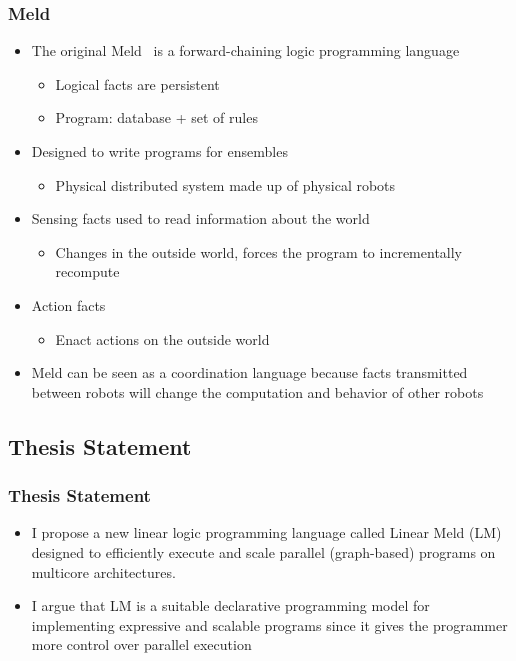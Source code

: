 \documentclass{beamer}
\begin{document}
\frame
{
   \frametitle{Meld}
   \begin{itemize}
      \item The original Meld~\cite{ashley-rollman-iclp09} is a forward-chaining logic programming language
      \begin{itemize}
         \item Logical facts are persistent
         \item Program: database + set of rules
      \end{itemize}
      
      \item Designed to write programs for ensembles
      \begin{itemize}
         \item Physical distributed system made up of physical robots
      \end{itemize}
      
      \item Sensing facts used to read information about the world
      \begin{itemize}
         \item Changes in the outside world, forces the program to incrementally recompute
      \end{itemize}
      
      \item Action facts
      \begin{itemize}
         \item Enact actions on the outside world
      \end{itemize}
      
      \item Meld can be seen as a coordination language because facts transmitted between robots will change the computation and behavior of other robots
   \end{itemize}
}

\subsection{Thesis Statement}

\frame
{
   \frametitle{Thesis Statement}
   \begin{itemize}
      \item I propose a new linear logic programming language called Linear Meld (LM) designed to efficiently execute and scale parallel (graph-based) programs on multicore architectures.
      \item I argue that LM is a suitable declarative programming model for implementing expressive and scalable programs since it gives the programmer more control over parallel execution
   \end{itemize}
}   
\end{document}
